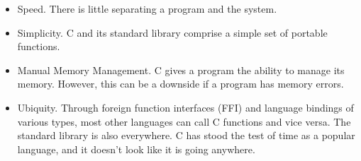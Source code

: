 \begin{itemize}
	\item Speed. There is little separating a program and the system.
	\item Simplicity.
    C and its standard library comprise a simple set of portable functions.
	\item Manual Memory Management.
    C gives a program the ability to manage its memory.
    However, this can be a downside if a program has memory errors.
  \item Ubiquity.
    Through foreign function interfaces (FFI) and language bindings of various types, most other languages can call C functions and vice versa.
    The standard library is also everywhere.
    C has stood the test of time as a popular language, and it doesn't look like it is going anywhere.
\end{itemize}



